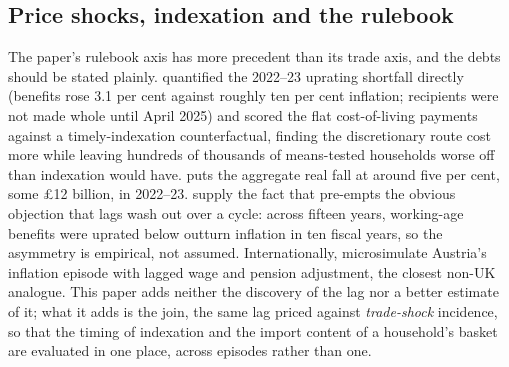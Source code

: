 \subsection{Price shocks, indexation and the rulebook}

The paper's rulebook axis has more precedent than its trade axis, and
the debts should be stated plainly. \citet{cribb2023} quantified the
2022--23 uprating shortfall directly (benefits rose 3.1 per cent
against roughly ten per cent inflation; recipients were not made whole
until April 2025) and scored the flat cost-of-living payments against
a timely-indexation counterfactual, finding the discretionary route
cost more while leaving hundreds of thousands of means-tested
households worse off than indexation would have. \citet{obrwelfare2022}
puts the aggregate real fall at around five per cent, some
\pounds 12 billion, in 2022--23. \citet{judgemurphy2023} supply the
fact that pre-empts the obvious objection that lags wash out over a
cycle: across fifteen years, working-age benefits were uprated below
outturn inflation in ten fiscal years, so the asymmetry is empirical,
not assumed. Internationally, \citet{eckerstorfer2025} microsimulate
Austria's inflation episode with lagged wage and pension adjustment,
the closest non-UK analogue. This paper adds neither the discovery of
the lag nor a better estimate of it; what it adds is the join, the
same lag priced against \emph{trade-shock} incidence, so that the
timing of indexation and the import content of a household's basket
are evaluated in one place, across episodes rather than one.

